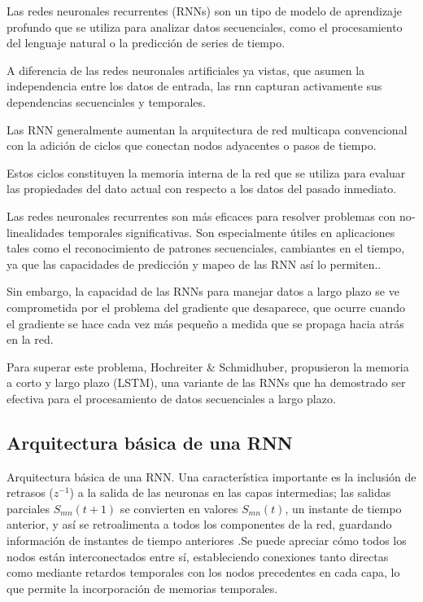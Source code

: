 Las redes neuronales recurrentes (RNNs) son un tipo de modelo de aprendizaje profundo que se utiliza para analizar datos secuenciales, como el procesamiento del lenguaje natural o la predicción de series de tiempo\cite{tomas2023prediccion}.

A diferencia de las redes neuronales artificiales ya vistas, que asumen la independencia entre los datos de entrada, las \gls{rnn} capturan activamente sus dependencias secuenciales y temporales\cite{arana2021redes}.

Las RNN generalmente aumentan la arquitectura de red multicapa convencional con la adición de ciclos que conectan nodos adyacentes o pasos de tiempo.

Estos ciclos constituyen la memoria interna de la red que se utiliza para evaluar las propiedades del dato actual con respecto a los datos del pasado inmediato.

Las redes neuronales recurrentes son más eficaces para resolver problemas con no­linealidades temporales significativas. Son especialmente útiles en aplicaciones tales
como el reconocimiento de patrones secuenciales, cambiantes en el tiempo, ya que las capacidades de predicción y mapeo de las RNN así lo permiten\cite{montesdeoca2016estudios}..

Sin embargo, la capacidad de las RNNs para manejar datos a largo plazo se ve comprometida por el problema del gradiente que desaparece, que ocurre cuando el gradiente se hace cada vez más pequeño a medida que se propaga hacia atrás en la red\cite{tomas2023prediccion}.


Para  superar  este  problema,  Hochreiter \& Schmidhuber,  propusieron  la  memoria  a  corto  y  largo  plazo  (LSTM),  una  variante  de  las  RNNs  que  ha  demostrado  ser efectiva para el procesamiento de datos secuenciales a largo plazo\cite{tomas2023prediccion}.


\subsection{Arquitectura básica de una RNN}
Arquitectura básica de una RNN. Una característica importante es la inclusión de retrasos ($z^{-1}$) a la salida de las neuronas en las capas intermedias; las salidas parciales $S_{mn}(t + 1)$ se convierten en valores $S_{mn}(t)$, un instante de tiempo anterior, y así se retroalimenta a todos los componentes de la red, guardando información de instantes de tiempo anteriores \cite{montesdeoca2016estudios}.Se puede apreciar cómo todos los nodos están interconectados entre sí, estableciendo conexiones tanto directas como mediante retardos temporales con los nodos precedentes en cada capa, lo que permite la incorporación de memorias temporales.

